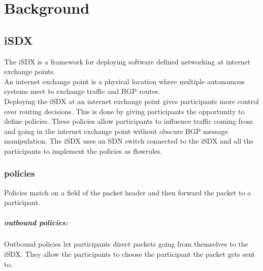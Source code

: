 
\chapter{\label{chapter2}Background}

\section{\label{chapter2:iSDX}iSDX}
The iSDX is a framework for deploying software defined networking at internet exchange points. \\
An internet exchange point is a physical location where multiple autonomous systems meet to exchange traffic and BGP routes. \\
Deploying the iSDX at an internet exchange point gives participants more control over routing decisions. This is done by giving participants the opportunity to define policies. These policies allow participants to influence traffic coming from and going in the internet exchange point without obscure BGP message manipulation. The iSDX uses an SDN switch connected to the iSDX and all the participants to implement the policies as flowrules.
\subsection{\label{chapter2:iSDX:policies}policies}
Policies match on a field of the packet header and then forward the packet to a participant.
\paragraph{\label{chapter2:iSDX:policies:outbound policies}outbound policies:}
Outbound policies let participants direct packets going from themselves to the iSDX. They allow the participants to choose the participant the packet gets sent to.
